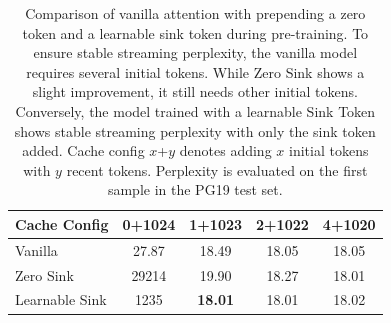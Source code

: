 \begin{table}
\centering
\setlength{\tabcolsep}{2pt}
\small
\vspace{-2em}
\caption{\small Comparison of vanilla attention with prepending a zero token and a learnable sink token during pre-training. To ensure stable streaming perplexity, the vanilla model requires several initial tokens. While Zero Sink shows a slight improvement, it still needs other initial tokens. Conversely, the model trained with a learnable Sink Token shows stable streaming perplexity with only the sink token added. Cache config $x$+$y$ denotes adding $x$ initial tokens with $y$ recent tokens. Perplexity is evaluated on the first sample in the PG19 test set.}
\label{tab:pretrain_fix}
\begin{tabular}{lcccc}
\toprule
Cache Config     & 0+1024 & 1+1023 & 2+1022 & 4+1020  \\
\midrule
Vanilla        & 27.87                      & 18.49  & 18.05  & 18.05   \\
Zero Sink      & 29214                   & 19.90  & 18.27  & 18.01   \\
Learnable Sink & 1235                    & \textbf{18.01}  & 18.01  & 18.02   \\
\bottomrule
\end{tabular}
\end{table}
